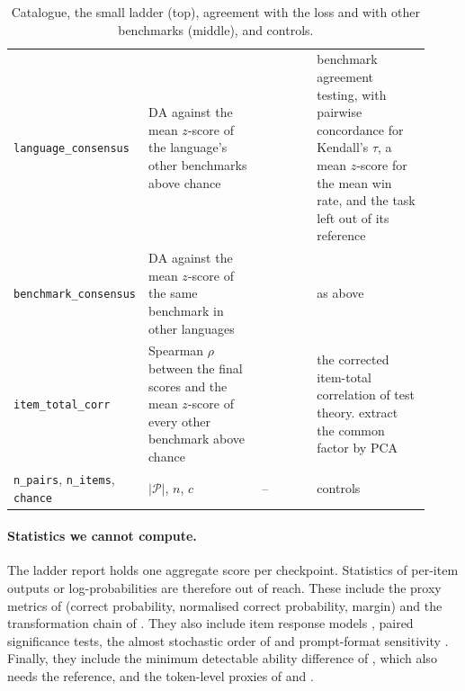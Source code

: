 \begin{table}[h]
\begin{tabular}{@{}p{0.215\linewidth}p{0.28\linewidth}p{0.14\linewidth}p{0.285\linewidth}@{}}
\texttt{language\_consensus} & $\mathrm{DA}$ against the mean $z$-score of the language's other benchmarks above chance & \citet{perlitz_benchbench_2024} & benchmark agreement testing, with pairwise concordance for Kendall's $\tau$, a mean $z$-score for the mean win rate, and the task left out of its reference \\
\texttt{benchmark\_consensus} & $\mathrm{DA}$ against the mean $z$-score of the same benchmark in other languages & \citet{perlitz_benchbench_2024} & as above \\
\texttt{item\_total\_corr} & Spearman $\rho$ between the final scores and the mean $z$-score of every other benchmark above chance & \citet{ruan_observational_2024, cronbach_coefficient_1951} & the corrected item-total correlation of test theory. \citet{ruan_observational_2024} extract the common factor by PCA \\
\midrule
\texttt{n\_pairs}, \texttt{n\_items}, \texttt{chance} & $|\mathcal{P}|$, $n$, $c$ & -- & controls \\
\bottomrule
\end{tabular}
\caption{Catalogue, the small ladder (top), agreement with the loss and with other benchmarks (middle), and controls.}
\label{tab:sur-agreement}
\end{table}

\paragraph{Statistics we cannot compute.}
The ladder report holds one aggregate score per checkpoint.
Statistics of per-item outputs or log-probabilities are therefore out of reach. These include the proxy metrics of \citet{magnusson_datadecide_2025} (correct probability, normalised correct probability, margin) and the transformation chain of \citet{schaeffer_why_2024}. They also include item response models \citep{polo_tinybenchmarks_2024, kipnis_metabench_2025}, paired significance tests, the almost stochastic order of \citet{dror_deep_2019} and prompt-format sensitivity \citep{alzahrani_when_2024}. Finally, they include the minimum detectable ability difference of \citet{yauney_reliable_2026}, which also needs the reference, and the token-level proxies of \citet{patel_forecasting_2026} and \citet{koh_predicting_2026}.

